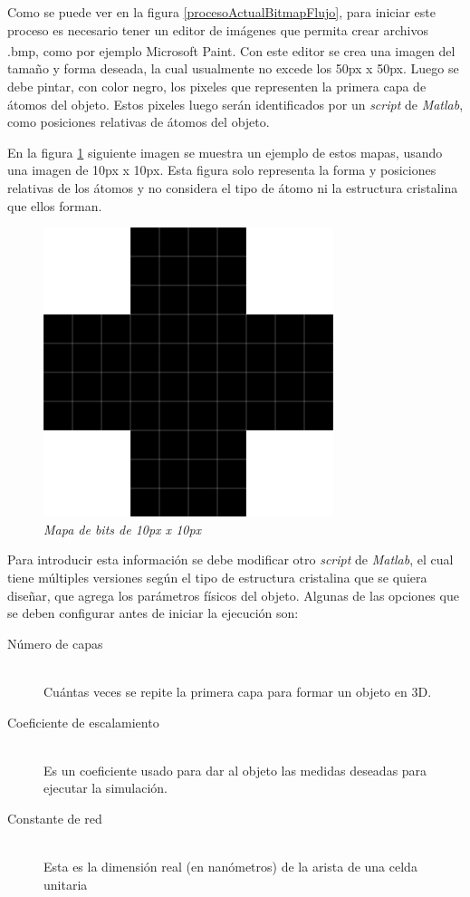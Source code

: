 Como se puede ver en la figura \ref{procesoActualBitmapFlujo}, para iniciar este proceso es necesario tener un editor de imágenes que permita crear archivos .bmp, como por ejemplo Microsoft Paint\textsuperscript{\textregistered}. Con este editor se crea una imagen del tamaño y forma deseada, la cual usualmente no excede los 50px x 50px. Luego se debe pintar, con color negro, los pixeles que representen la primera capa de átomos del objeto. Estos pixeles luego serán identificados por un \emph{script} de \emph{Matlab}, como posiciones relativas de átomos del objeto.

En la figura \ref{procesoActualBitmap} siguiente imagen se muestra un ejemplo de estos mapas, usando una imagen de 10px x 10px. Esta figura solo representa la forma y posiciones relativas de los átomos y no considera el tipo de átomo ni la estructura cristalina que ellos forman.

\begin{figure}[ht]
  \centering
  \includegraphics[scale=.6]{images/procesoActualBitmap}
  \caption{\em Mapa de bits de 10px x 10px}
  \label{procesoActualBitmap}
\end{figure}

Para introducir esta información se debe modificar otro \emph{script} de \emph{Matlab}, el cual tiene múltiples versiones según el tipo de estructura cristalina que se quiera diseñar, que agrega los parámetros físicos del objeto. Algunas de las opciones que se deben configurar antes de iniciar la ejecución son:

\begin{description}
	\item [Número de capas] \hfill \\
		Cuántas veces se repite la primera capa para formar un objeto en 3D.
	\item [Coeficiente de escalamiento] \hfill \\
		Es un coeficiente usado para dar al objeto las medidas deseadas para ejecutar la simulación.
	\item [Constante de red] \hfill \\
		Esta es la dimensión real (en nanómetros) de la arista de una celda unitaria
\end{description}

